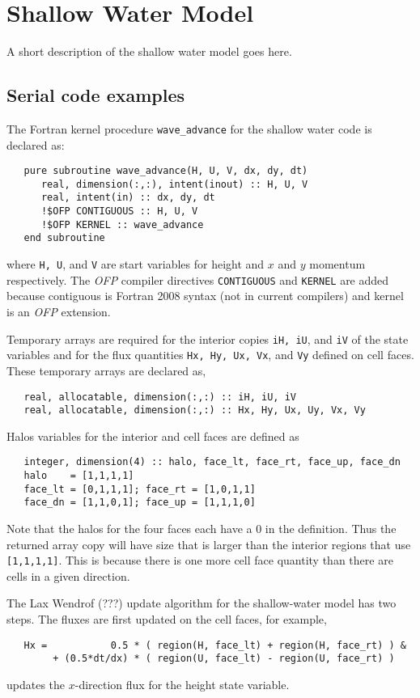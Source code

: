 \section{Shallow Water Model}

A short description of the shallow water model goes here.

\subsection{Serial code examples}

The Fortran kernel procedure {\tt wave\_advance} for the shallow water code
is declared as:
\begin{verbatim}
   pure subroutine wave_advance(H, U, V, dx, dy, dt)
      real, dimension(:,:), intent(inout) :: H, U, V
      real, intent(in) :: dx, dy, dt
      !$OFP CONTIGUOUS :: H, U, V
      !$OFP KERNEL :: wave_advance
   end subroutine
\end{verbatim}
where {\tt H, U}, and {\tt V} are start variables for height and
$x$ and $y$ momentum respectively.  The \emph{OFP} compiler directives
{\tt CONTIGUOUS} and {\tt KERNEL} are added because contiguous is Fortran
2008 syntax (not in current compilers) and kernel is an \emph{OFP} extension.

Temporary arrays are required for the interior copies {\tt iH, iU}, and
{\tt iV} of the state variables and for the flux quantities {\tt Hx, Hy, Ux,
Vx}, and {\tt Vy} defined on cell faces.  These temporary arrays are declared as,
\begin{verbatim}
   real, allocatable, dimension(:,:) :: iH, iU, iV
   real, allocatable, dimension(:,:) :: Hx, Hy, Ux, Uy, Vx, Vy
\end{verbatim}

Halos variables for the interior and cell faces are defined as
\begin{verbatim}
   integer, dimension(4) :: halo, face_lt, face_rt, face_up, face_dn
   halo    = [1,1,1,1]
   face_lt = [0,1,1,1]; face_rt = [1,0,1,1]
   face_dn = [1,1,0,1]; face_up = [1,1,1,0]
\end{verbatim}
Note that the halos for the four faces each have a 0 in the definition. Thus the returned
array copy will have size that is larger than the interior regions that use {\tt [1,1,1,1]}.
This is because there is one more cell face quantity than there are cells in a given direction.

The Lax Wendrof (???) update algorithm for the shallow-water model has two steps.
The fluxes are first updated on the cell faces, for example,
\begin{verbatim}
   Hx =           0.5 * ( region(H, face_lt) + region(H, face_rt) ) &
        + (0.5*dt/dx) * ( region(U, face_lt) - region(U, face_rt) )
\end{verbatim}
updates the $x$-direction flux for the height state variable.

